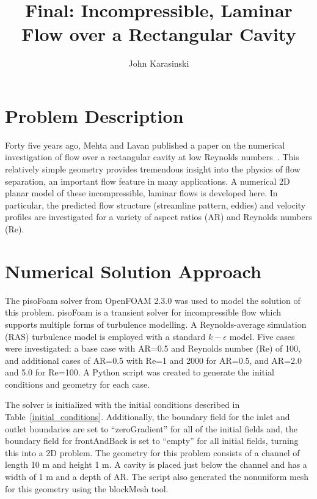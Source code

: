 \documentclass[twocolumn,10pt]{asme2ej}
\title{Final: Incompressible, Laminar Flow over a Rectangular Cavity}
\author{John Karasinski
    \affiliation{
  Graduate Student Researcher\\
  Center for Human/Robotics/Vehicle Integration and Performance\\
  Department of Mechanical and Aerospace Engineering\\
  University of California\\
  Davis, California 95616\\
    Email: karasinski@ucdavis.edu
    }
}
\begin{document}
\maketitle

\section{Problem Description}

Forty five years ago, Mehta and Lavan published a paper on the numerical investigation of flow over a rectangular cavity at low Reynolds numbers~\cite{mehta1969flow}. This relatively simple geometry provides tremendous insight into the physics of flow separation, an important flow feature in many applications. A numerical 2D planar model of these incompressible, laminar flows is developed here. In particular, the predicted flow structure (streamline pattern, eddies) and velocity profiles are investigated for a variety of aspect ratios (AR) and Reynolds numbers (Re).

\section{Numerical Solution Approach}

The pisoFoam solver from OpenFOAM 2.3.0 was used to model the solution of this problem. pisoFoam is a transient solver for incompressible flow which supports multiple forms of turbulence modelling. A Reynolds-average simulation (RAS) turbulence model is employed with a standard $k-\epsilon$ model. Five cases were investigated: a base case with AR=0.5 and Reynolds number (Re) of 100, and additional cases of AR=0.5 with Re=1 and 2000 for AR=0.5, and AR=2.0 and 5.0 for Re=100. A Python script was created to generate the initial conditions and geometry for each case.

The solver is initialized with the initial conditions described in Table~\ref{initial_conditions}. Additionally, the boundary field for the inlet and outlet boundaries are set to ``zeroGradient'' for all of the initial fields and, the boundary field for frontAndBack is set to ``empty'' for all initial fields, turning this into a 2D problem. The geometry for this problem consists of a channel of length 10 m and height 1 m. A cavity is placed just below the channel and has a width of 1 m and a depth of AR. The script also generated the nonuniform mesh for this geometry using the blockMesh tool.
\end{document}

